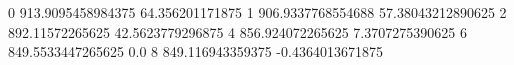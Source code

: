 0 913.9095458984375 64.356201171875
1 906.9337768554688 57.38043212890625
2 892.11572265625 42.5623779296875
4 856.924072265625 7.3707275390625
6 849.5533447265625 0.0
8 849.116943359375 -0.4364013671875
